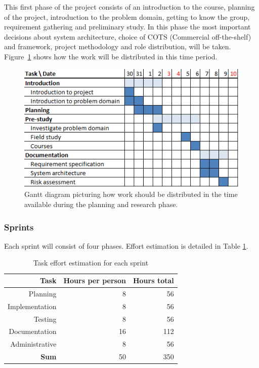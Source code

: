 This first phase of the project consists of an introduction to the course,
planning of the project, introduction to the problem domain, getting to know the
group, requirement gathering and preliminary study. In this phase the most
important decisions about system architecture, choice of COTS (Commercial
off-the-shelf) and framework, project methodology and role distribution, will be
taken. Figure~\ref{gantt:pre_imp} shows how the work will be distributed in this
time period.

\begin{figure}[h]
\centering
  \includegraphics[width=1.0\textwidth]{project_management/pre_implementation_gantt}
  \caption[Gantt chart of planning and research phase]{Gantt diagram picturing how work should be distributed in the time available during the planning and research phase.}
  \label{gantt:pre_imp}
\end{figure}

\subsubsection{Sprints}

Each sprint will consist of four phases. Effort estimation is
detailed in Table \ref{Sprint effort estimation}.

\begin{table}[htbp]
\begin{center}
  \begin{tabular}{|r|r|r|}
    \hline
    \bf{Task} & \bf{Hours per person} & \bf{Hours total} \\
    \hline
    Planning & 8 & 56 \\
    Implementation & 8 & 56 \\
    Testing & 8 & 56 \\
    Documentation & 16 & 112 \\
    Administrative & 8 & 56 \\
    \hline \hline
    \bf{Sum} & 50 & 350 \\
    \hline
  \end{tabular}
  \caption{Task effort estimation for each sprint}
  \label{Sprint effort estimation}
\end{center}
\end{table}


